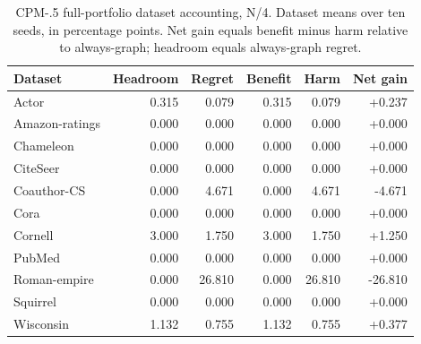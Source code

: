 \begin{table}[tbp]
\centering
\caption{CPM-.5 full-portfolio dataset accounting, N/4. Dataset means over ten seeds, in percentage points. Net gain equals benefit minus harm relative to always-graph; headroom equals always-graph regret.}
\label{tab:cpm_account_N_4}
\small
\setlength{\tabcolsep}{3pt}
\begin{tabular}{@{}lrrrrr@{}}
\toprule
Dataset & Headroom & Regret & Benefit & Harm & Net gain \\
\midrule
Actor & 0.315 & 0.079 & 0.315 & 0.079 & +0.237 \\
Amazon-ratings & 0.000 & 0.000 & 0.000 & 0.000 & +0.000 \\
Chameleon & 0.000 & 0.000 & 0.000 & 0.000 & +0.000 \\
CiteSeer & 0.000 & 0.000 & 0.000 & 0.000 & +0.000 \\
Coauthor-CS & 0.000 & 4.671 & 0.000 & 4.671 & -4.671 \\
Cora & 0.000 & 0.000 & 0.000 & 0.000 & +0.000 \\
Cornell & 3.000 & 1.750 & 3.000 & 1.750 & +1.250 \\
PubMed & 0.000 & 0.000 & 0.000 & 0.000 & +0.000 \\
Roman-empire & 0.000 & 26.810 & 0.000 & 26.810 & -26.810 \\
Squirrel & 0.000 & 0.000 & 0.000 & 0.000 & +0.000 \\
Wisconsin & 1.132 & 0.755 & 1.132 & 0.755 & +0.377 \\
\bottomrule
\end{tabular}
\end{table}

